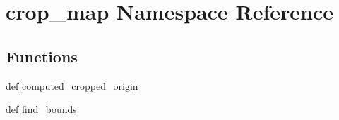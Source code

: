 \hypertarget{namespacecrop__map}{\section{crop\-\_\-map Namespace Reference}
\label{namespacecrop__map}
}
\subsection*{Functions}
\begin{DoxyCompactItemize}
\item 
def \hyperlink{namespacecrop__map_a88dd7bb50d457a2feb6e9587dd59c57d}{computed\-\_\-cropped\-\_\-origin}
\item 
def \hyperlink{namespacecrop__map_af40274c22a8c8ec323ede2c6353d653a}{find\-\_\-bounds}
\end{DoxyCompactItemize}
